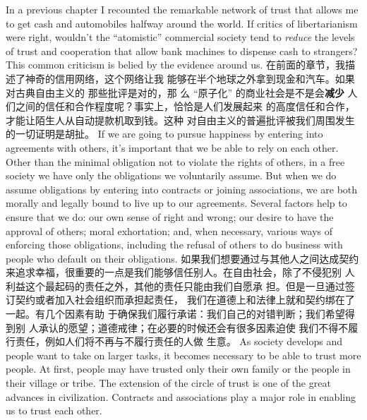 \begin{paracol}{2}
In a previous chapter I recounted the remarkable network of
trust that allows me to get cash and automobiles halfway
around the world. If critics of libertarianism were right, wouldn't
the ``atomistic'' commercial society tend to \textit{reduce} the levels of
trust and cooperation that allow bank machines to dispense
cash to strangers? This common criticism is belied by the evidence around us.
\switchcolumn
在前面的章节，我描述了神奇的信用网络，这个网络让我
能够在半个地球之外拿到现金和汽车。如果对古典自由主义的
那些批评是对的，那 么 “原子化” 的商业社会是不是会\textbf{减少}
人们之间的信任和合作程度呢？事实上，恰恰是人们发展起来
的高度信任和合作，才能让陌生人从自动提款机取到钱。这种
对自由主义的普遍批评被我们周围发生的一切证明是胡扯。
\switchcolumn*
If we are going to pursue happiness by entering into agreements with others, it's important that we be able to rely on each
other. Other than the minimal obligation not to violate the
rights of others, in a free society we have only the obligations
we voluntarily assume. But when we do assume obligations by
entering into contracts or joining associations, we are both
morally and legally bound to live up to our agreements. Several
factors help to ensure that we do: our own sense of right and
wrong; our desire to have the approval of others; moral exhortation; and, when necessary, various ways of enforcing those
obligations, including the refusal of others to do business with
people who default on their obligations.
\switchcolumn
如果我们想要通过与其他人之间达成契约来追求幸福，很重要的一点是我们能够信任别人。在自由社会，除了不侵犯别
人利益这个最起码的责任之外，其他的责任只能由我们自愿承
担。但是一旦通过签订契约或者加入社会组织而承担起责任，
我们在道德上和法律上就和契约绑在了一起。有几个因素有助
于确保我们履行承诺：我们自己的对错判断；我们希望得到别
人承认的愿望；道德戒律；在必要的时候还会有很多因素迫使
我们不得不履行责任，例如人们将不再与不履行责任的人做
生意。  
\switchcolumn*
As society develops and people want to take on larger tasks,
it becomes necessary to be able to trust more people. At first,
people may have trusted only their own family or the people in
their village or tribe. The extension of the circle of trust is one of
the great advances in civilization. Contracts and associations
play a major role in enabling us to trust each other.

\end{paracol}
